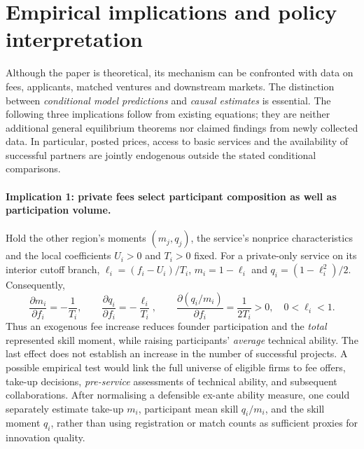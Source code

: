 \documentclass[11pt]{article}
\begin{document}
\section{Empirical implications and policy interpretation}\label{sec:empirical}

Although the paper is theoretical, its mechanism can be confronted with data on fees, applicants, matched ventures and downstream markets. The distinction between \emph{conditional model predictions} and \emph{causal estimates} is essential. The following three implications follow from existing equations; they are neither additional general equilibrium theorems nor claimed findings from newly collected data. In particular, posted prices, access to basic services and the availability of successful partners are jointly endogenous outside the stated conditional comparisons.

\paragraph{Implication 1: private fees select participant composition as well as participation volume.}
Hold the other region's moments $(m_j,q_j)$, the service's nonprice characteristics and the local coefficients $U_i>0$ and $T_i>0$ fixed. For a private-only service on its interior cutoff branch, $\ell_i=(f_i-U_i)/T_i$, $m_i=1-\ell_i$ and $q_i=(1-\ell_i^2)/2$. Consequently,
\begin{equation}
 \frac{\partial m_i}{\partial f_i}=-\frac1{T_i},\qquad
 \frac{\partial q_i}{\partial f_i}=-\frac{\ell_i}{T_i},\qquad
 \frac{\partial(q_i/m_i)}{\partial f_i}=\frac1{2T_i}>0,
 \quad 0<\ell_i<1.
 \label{eq:empirical-screen}
\end{equation}
Thus an exogenous fee increase reduces founder participation and the \emph{total} represented skill moment, while raising participants' \emph{average} technical ability. The last effect does not establish an increase in the number of successful projects. A possible empirical test would link the full universe of eligible firms to fee offers, take-up decisions, \emph{pre-service} assessments of technical ability, and subsequent collaborations. After normalising a defensible ex-ante ability measure, one could separately estimate take-up $m_i$, participant mean skill $q_i/m_i$, and the skill moment $q_i$, rather than using registration or match counts as sufficient proxies for innovation quality.
\end{document}
